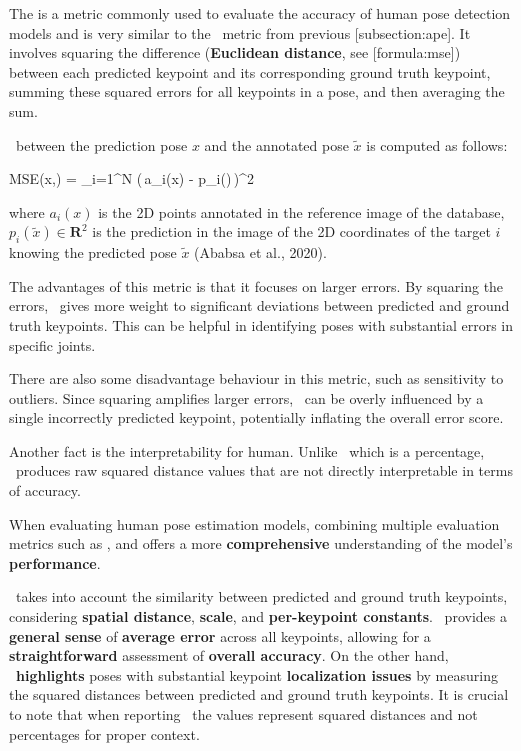 The {\bf \MSE} is a metric commonly used to evaluate the accuracy of human pose detection models and is very similar to the \APE\ metric from previous [subsection:ape]. It involves squaring the difference ({\bf Euclidean distance}, see [formula:mse]) between each predicted keypoint and its corresponding ground truth keypoint, summing these squared errors for all keypoints in a pose, and then averaging the sum.

\MSE\ between the prediction pose $ x $ and the annotated pose $ \tilde{x}$ is computed as follows:

\startplaceformula[reference=formula:mse]
    \startformula MSE(x,) =  \sum_{i=1}^{N} (\,a_i(x) - p_i()\,)^{2}
    \stopformula
\stopplaceformula

where $ a_i (x) $ is the 2D points annotated in the reference image of the database, $ p_i (\tilde{x}) \in  \mathbf R^2 $ is the prediction in the image of the 2D coordinates of the target $ i $ knowing the predicted pose $ \tilde{x} $ (Ababsa et al., 2020).

The advantages of this metric is that it focuses on larger errors. By squaring the errors, \MSE\ gives more weight to significant deviations between predicted and ground truth keypoints. This can be helpful in identifying poses with substantial errors in specific joints.

There are also some disadvantage behaviour in this metric, such as sensitivity to outliers. Since squaring amplifies larger errors, \MSE\ can be overly influenced by a single incorrectly predicted keypoint, potentially inflating the overall error score.

Another fact is the interpretability for human. Unlike \APE\, which is a percentage, \MSE\ produces raw squared distance values that are not directly interpretable in terms of accuracy.


When evaluating human pose estimation models, combining multiple evaluation metrics such as {\bf \OKS}, {\bf \APE} and {\bf \MSE} offers a more {\bf comprehensive} understanding of the model's {\bf performance}.

\OKS\ takes into account the similarity between predicted and ground truth keypoints, considering {\bf spatial distance}, {\bf scale}, and {\bf per-keypoint constants}. \APE\ provides a {\bf general sense} of {\bf average error} across all keypoints, allowing for a {\bf straightforward} assessment of {\bf overall accuracy}. On the other hand, \MSE\ {\bf highlights} poses with substantial keypoint {\bf localization issues} by measuring the squared distances between predicted and ground truth keypoints. It is crucial to note that when reporting \MSE\, the values represent squared distances and not percentages for proper context.

